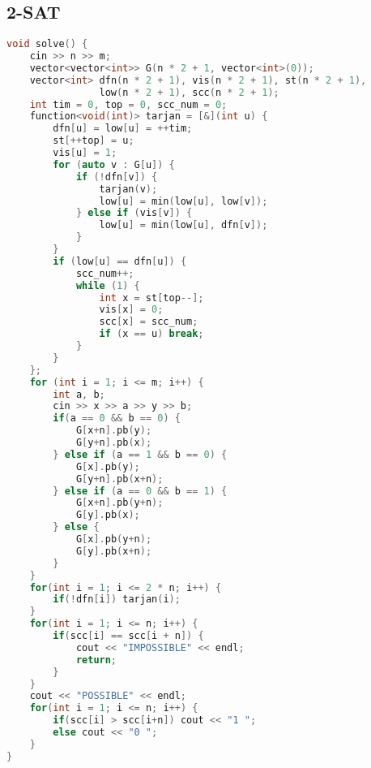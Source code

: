 \subsection{2-SAT}
\begin{lstlisting}[language=c++]
void solve() {
	cin >> n >> m;
	vector<vector<int>> G(n * 2 + 1, vector<int>(0));
	vector<int> dfn(n * 2 + 1), vis(n * 2 + 1), st(n * 2 + 1),
				low(n * 2 + 1), scc(n * 2 + 1);
	int tim = 0, top = 0, scc_num = 0;
    function<void(int)> tarjan = [&](int u) {
        dfn[u] = low[u] = ++tim;
        st[++top] = u;
        vis[u] = 1;
        for (auto v : G[u]) {
            if (!dfn[v]) {
                tarjan(v);
                low[u] = min(low[u], low[v]);
            } else if (vis[v]) {
                low[u] = min(low[u], dfn[v]);
            }
        }
        if (low[u] == dfn[u]) {
            scc_num++;
            while (1) {
                int x = st[top--];
                vis[x] = 0;
                scc[x] = scc_num;
                if (x == u) break;
            }
        }
    };
	for (int i = 1; i <= m; i++) {
		int a, b;
		cin >> x >> a >> y >> b;
		if(a == 0 && b == 0) {
			G[x+n].pb(y);
			G[y+n].pb(x);
		} else if (a == 1 && b == 0) {
			G[x].pb(y);
			G[y+n].pb(x+n);
		} else if (a == 0 && b == 1) {
			G[x+n].pb(y+n);
			G[y].pb(x);
		} else {
			G[x].pb(y+n);
			G[y].pb(x+n);
		}
	}
	for(int i = 1; i <= 2 * n; i++) {
		if(!dfn[i]) tarjan(i);
	}
	for(int i = 1; i <= n; i++) {
		if(scc[i] == scc[i + n]) {
			cout << "IMPOSSIBLE" << endl;
			return;
		}
	}
	cout << "POSSIBLE" << endl;
	for(int i = 1; i <= n; i++) {
		if(scc[i] > scc[i+n]) cout << "1 ";
		else cout << "0 ";
	}
}
\end{lstlisting}